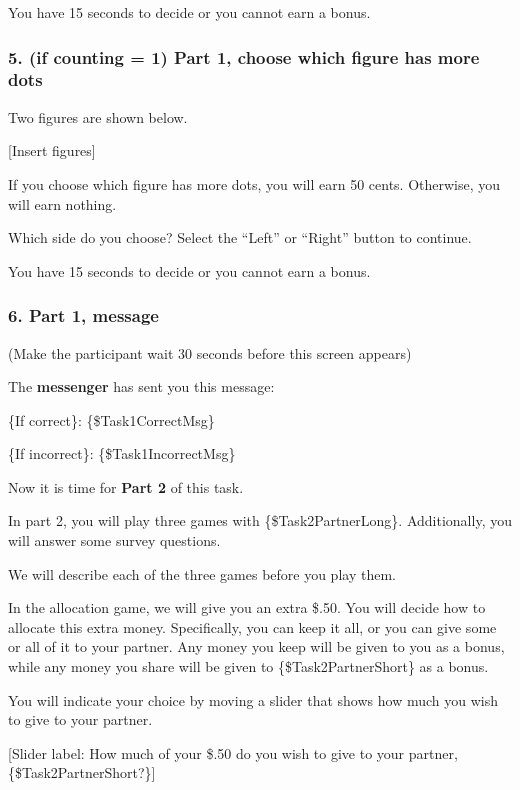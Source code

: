 You have 15 seconds to decide or you cannot
earn a bonus.

\subsubsection*{5. (if counting = 1) Part 1, choose which figure has more dots}

Two figures are shown below. 

[Insert figures] 

If you choose which figure has
more dots, you will earn 50 cents. Otherwise, you will earn nothing. 

Which side
do you choose? Select the ``Left'' or ``Right'' button to continue. 

You have 15
seconds to decide or you cannot earn a bonus.

\subsubsection*{6. Part 1, message}

(Make the participant wait 30 seconds before this screen appears) 

The
\textbf{messenger} has sent you this message: 

\{If correct\}: \{\$Task1CorrectMsg\}

\{If
incorrect\}: \{\$Task1IncorrectMsg\}

\begin{description}[listparindent = 1.5em]
    \item[Part 2 Instructions] \hspace{1cm}
    
    Now it is time for \textbf{Part 2} of this task. 
    
    In part 2, you will play three
    games with \{\$Task2PartnerLong\}. Additionally, you will answer some survey
    questions. 
    
    We will describe each of the three games before you play them.
\end{description}

\begin{description}[listparindent = 1.5em]
    \item[Allocation game:]  \hspace{1cm}
    
    In the allocation game, we will give you an extra \$.50. You will decide
    how to allocate this extra money. Specifically, you can keep it all, or you
    can give some or all of it to your partner. Any money you keep will be given
    to you as a bonus, while any money you share will be given to
    \{\$Task2PartnerShort\} as a bonus. 
    
    You will indicate your choice by moving a
    slider that shows how much you wish to give to your partner. 
    
    [Slider label:
    How much of your \$.50 do you wish to give to your partner,
    \{\$Task2PartnerShort?\}]
\end{description}

